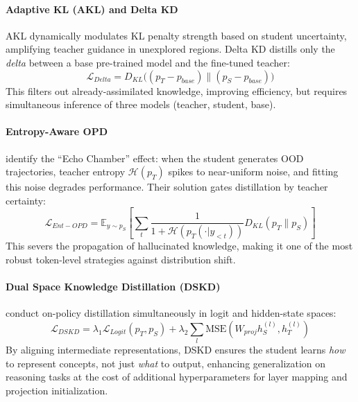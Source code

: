 \documentclass{article} %
\begin{document}
\paragraph{Adaptive KL (AKL) and Delta KD}
AKL \citep{2404.02657} dynamically modulates KL penalty strength based on student uncertainty, amplifying teacher guidance in unexplored regions.
Delta KD \citep{2509.14526} distills only the \textit{delta} between a base pre-trained model and the fine-tuned teacher:
\begin{equation}
    \mathcal{L}_{Delta} = D_{KL}\big( (p_T - p_{base}) \parallel (p_S - p_{base}) \big)
\end{equation}
This filters out already-assimilated knowledge, improving efficiency, but requires simultaneous inference of three models (teacher, student, base).

\paragraph{Entropy-Aware OPD}
\citet{2603.07079} identify the ``Echo Chamber'' effect: when the student generates OOD trajectories, teacher entropy $\mathcal{H}(p_T)$ spikes to near-uniform noise, and fitting this noise degrades performance. Their solution gates distillation by teacher certainty:
\begin{equation}
    \mathcal{L}_{Ent-OPD} = \mathbb{E}_{y \sim p_S} \left[ \sum_t \frac{1}{1 + \mathcal{H}(p_T(\cdot|y_{<t}))} D_{KL}(p_T \parallel p_S) \right]
\end{equation}
This severs the propagation of hallucinated knowledge, making it one of the most robust token-level strategies against distribution shift.

\paragraph{Dual Space Knowledge Distillation (DSKD)}
\citet{2504.11426} conduct on-policy distillation simultaneously in logit and hidden-state spaces:
\begin{equation}
    \mathcal{L}_{DSKD} = \lambda_1 \mathcal{L}_{Logit}(p_T, p_S) + \lambda_2 \sum_{l} \text{MSE}\left( W_{proj} h_S^{(l)}, h_T^{(l)} \right)
\end{equation}
By aligning intermediate representations, DSKD ensures the student learns \textit{how} to represent concepts, not just \textit{what} to output, enhancing generalization on reasoning tasks at the cost of additional hyperparameters for layer mapping and projection initialization.
\end{document}
